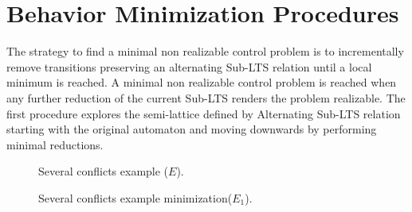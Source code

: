 \section{Behavior Minimization Procedures}\label{sect:solution}

The strategy to find a minimal non realizable control problem is to incrementally remove transitions preserving an alternating Sub-LTS relation until a local minimum is reached.  A minimal non realizable control problem is reached when any further reduction of the current Sub-LTS renders the problem realizable.
The first procedure explores the semi-lattice defined by Alternating Sub-LTS relation starting with the original automaton and moving downwards by performing minimal reductions. 
  
\begin{figure}[bt]
\centering
\SmallPicture
{}
\caption{Several conflicts example ($E$).}
\label{fig:fig.several-conflicts}
\MediumPicture
\end{figure}

\begin{figure}[bt]
\centering
\SmallPicture
{}
\caption{Several conflicts example minimization($E_1$).}
\label{fig:fig.several-conflicts-min1}
\MediumPicture
\vspace{-1em}
\end{figure}

